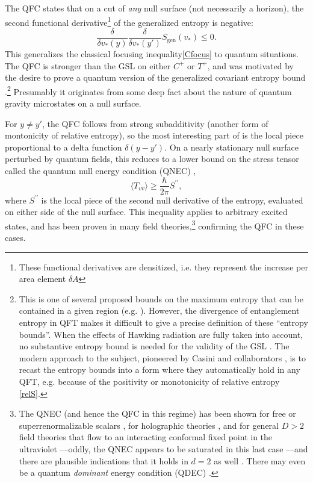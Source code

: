 \documentclass[12pt]{article}
\def\be{\begin{equation}}
\def\ee{\end{equation}}
\begin{document}
The QFC \cite{bousso2016quantum} states that on a cut of \emph{any} null surface (not necessarily a horizon), the second functional derivative\footnote{These functional derivatives are densitized, i.e. they represent the increase per area element $\delta A$} of the generalized entropy is negative:
\be \label{eq:qfc}
\frac{\delta}{\delta v_*(y)} \frac{\delta}{\delta v_*(y')} S_\mathrm{gen}(v_*) \le 0.
\ee
This generalizes the classical focusing inequality\eqref{Cfocus} to quantum situations.  The QFC is stronger than the GSL on either $C^+$ or $T^+$, and was motivated by the desire to prove a quantum version \cite{Strominger:2003br} of the generalized covariant entropy bound \cite{GCEB}.\footnote{This is one of several proposed bounds on the maximum entropy that can be contained in a given region (e.g. \cite{bekenstein1981universal,Bousso:1999xy,GCEB}).  However, the divergence of entanglement entropy in QFT makes it difficult to give a precise definition of these ``entropy bounds''.  When the effects of Hawking radiation are fully taken into account, no substantive entropy bound is needed for the validity of the GSL \cite{unruh1982acceleration,Marolf:2003wu,Marolf:2003sq,10proofs,wall2011}.  The modern approach to the subject, pioneered by Casini and collaborators \cite{Casini:2008cr,Blanco:2013lea,GCEBq,Bousso:2014uxa}, is to recast the entropy bounds into a form where they automatically hold in any QFT, e.g. because of the positivity or monotonicity of relative entropy \eqref{relS}.}  Presumably it originates from some deep fact about the nature of quantum gravity microstates on a null surface.

For $y \ne y'$, the QFC follows from strong subadditivity (another form of montonicity of relative entropy), so the most interesting part of \label{ref:qfc} is the local piece proportional to a delta function $\delta(y - y')$.  On a nearly stationary null surface perturbed by quantum fields, this reduces to a lower bound on the stress tensor called the quantum null energy condition (QNEC) \cite{bousso2016quantum},
\be
\langle T_{vv} \rangle \ge \frac{\hbar}{2\pi}S^{\prime\prime},
\ee 
where $S^{\prime\prime}$ is the local piece of the second null derivative of the entropy, evaluated on either side of the null surface.  This inequality applies to arbitrary excited states, and has been proven in many field theories,\footnote{The QNEC (and hence the QFC in this regime) has been shown for free or superrenormalizable scalars \cite{Bousso:2015wca}, for holographic theories \cite{Koeller:2015qmn}, and for general $D > 2$ field theories that flow to an interacting conformal fixed point in the ultraviolet \cite{Balakrishnan:2017bjg}---oddly, the QNEC appears to be saturated in this last case \cite{Leichenauer:2018obf,BCFLSunpub}---and there are plausible indications that it holds in $d = 2$ as well \cite{wall2011b,Wall:2017blw}.  There may even be a quantum \emph{dominant} energy condition (QDEC) \cite{Wall:2017blw}.} confirming the QFC in these cases.
\end{document}

